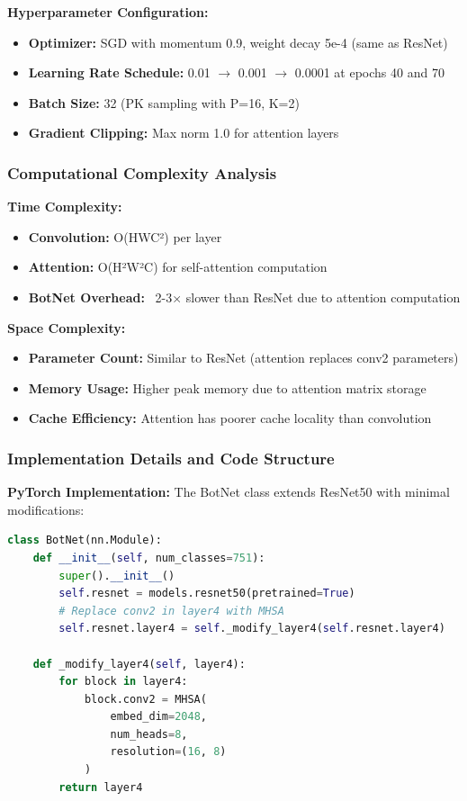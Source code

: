 \documentclass[a4paper,12pt]{article}
\begin{document}
\textbf{Hyperparameter Configuration:}
\begin{itemize}
    \item \textbf{Optimizer:} SGD with momentum 0.9, weight decay 5e-4 (same as ResNet)
    \item \textbf{Learning Rate Schedule:} 0.01 $\to$ 0.001 $\to$ 0.0001 at epochs 40 and 70
    \item \textbf{Batch Size:} 32 (PK sampling with P=16, K=2)
    \item \textbf{Gradient Clipping:} Max norm 1.0 for attention layers
\end{itemize}

\subsubsection{Computational Complexity Analysis}

\textbf{Time Complexity:}
\begin{itemize}
    \item \textbf{Convolution:} O(HWC²) per layer
    \item \textbf{Attention:} O(H²W²C) for self-attention computation
    \item \textbf{BotNet Overhead:} ~2-3× slower than ResNet due to attention computation
\end{itemize}

\textbf{Space Complexity:}
\begin{itemize}
    \item \textbf{Parameter Count:} Similar to ResNet (attention replaces conv2 parameters)
    \item \textbf{Memory Usage:} Higher peak memory due to attention matrix storage
    \item \textbf{Cache Efficiency:} Attention has poorer cache locality than convolution
\end{itemize}

\subsubsection{Implementation Details and Code Structure}

\textbf{PyTorch Implementation:}
The BotNet class extends ResNet50 with minimal modifications:
\begin{lstlisting}[language=Python, caption=BotNet Implementation]
class BotNet(nn.Module):
    def __init__(self, num_classes=751):
        super().__init__()
        self.resnet = models.resnet50(pretrained=True)
        # Replace conv2 in layer4 with MHSA
        self.resnet.layer4 = self._modify_layer4(self.resnet.layer4)
        
    def _modify_layer4(self, layer4):
        for block in layer4:
            block.conv2 = MHSA(
                embed_dim=2048,
                num_heads=8,
                resolution=(16, 8)
            )
        return layer4
\end{lstlisting}
\end{document}
